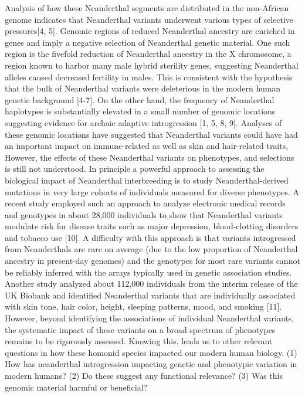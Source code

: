 Analysis of how these Neanderthal segments are distributed in the non-African genome indicates that Neanderthal variants underwent various types of selective pressures[4, 5]. Genomic regions of reduced Neanderthal ancestry are enriched in genes and imply a negative selection of Neanderthal genetic material. One such region is the fivefold reduction of Neanderthal ancestry in the X chromosome, a region known to harbor many male hybrid sterility genes, suggesting Neanderthal alleles caused decreased fertility in males. This is consistent with the hypothesis that the bulk of Neanderthal variants were deleterious in the modern human genetic background [4-7]. 
On the other hand, the frequency of Neanderthal haplotypes is substantially elevated in a small number of genomic locations suggesting evidence for archaic adaptive introgression [1, 5, 8, 9]. Analyses of these genomic locations have suggested that Neanderthal variants could have had an important impact on immune-related as well as skin and hair-related traits, However, the effects of these Neanderthal variants on phenotypes, and selections is still not understood.
In principle a powerful approach to assessing the biological impact of Neanderthal interbreeding is to study Neanderthal-derived mutations in very large cohorts of individuals measured for diverse phenotypes. A recent study employed such an approach to analyze electronic medical records and genotypes in about 28,000 individuals to show that Neanderthal variants modulate risk for disease traits such as major depression, blood-clotting disorders and tobacco use [10]. A difficulty with this approach is that variants introgressed from Neanderthals are rare on average (due to the low proportion of Neanderthal ancestry in present-day genomes) and the genotypes for most rare variants cannot be reliably inferred with the arrays typically used in genetic association studies. Another study analyzed about 112,000 individuals from the interim release of the UK Biobank and identified Neanderthal variants that are individually associated with skin tone, hair color, height, sleeping patterns, mood, and smoking [11]. However, beyond identifying the associations of individual Neanderthal variants, the systematic impact of these variants on a broad spectrum of phenotypes remains to be rigorously assessed. Knowing this, leads us to other relevant questions in how these homonid species impacted our modern human biology. (1) How has neanderthal introgression impacting genetic and phenotypic variation in modern humans? (2) Do these suggest any functional relevance? (3) Was this genomic material harmful or beneficial? 

